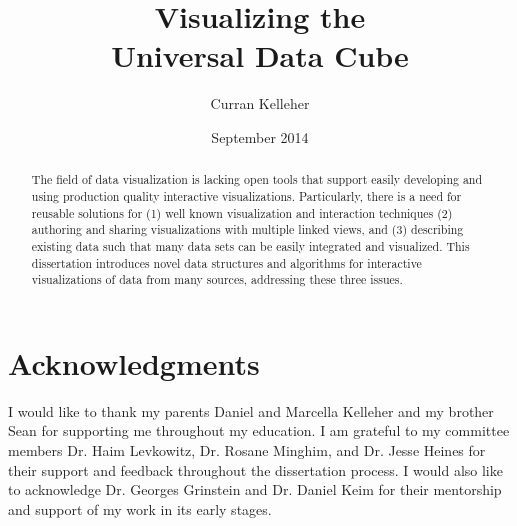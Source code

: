 \documentclass{umthesis}          %
\begin{document}
\title{Visualizing the\\Universal Data Cube}
\author{Curran Kelleher}
\date{September 2014}


\frontmatter
\maketitle
\copyrightpage     %
\signaturepage



\chapter{Acknowledgments}             %
I would like to thank my parents Daniel and Marcella Kelleher and my brother Sean for supporting me throughout my education. I am grateful to my committee members Dr. Haim Levkowitz, Dr. Rosane Minghim, and Dr. Jesse Heines for their support and feedback throughout the dissertation process. I would also like to acknowledge Dr. Georges Grinstein and Dr. Daniel Keim for their mentorship and support of my work in its early stages.

\begin{abstract}
The field of data visualization is lacking open tools that support easily developing and using production quality interactive visualizations. Particularly, there is a need for reusable solutions for (1) well known visualization and interaction techniques (2) authoring and sharing visualizations with multiple linked views, and (3) describing existing data such that many data sets can be easily integrated and visualized. This dissertation introduces novel data structures and algorithms for interactive visualizations of data from many sources, addressing these three issues.
\end{abstract}
\end{document}
